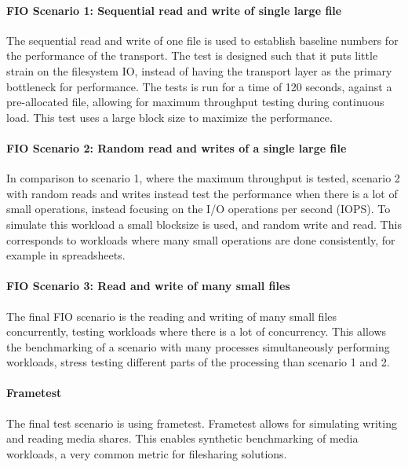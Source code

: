 \documentclass[english, 12pt, a4paper, elec, utf8, a-2b, online]{aaltothesis}
\begin{document}
\paragraph{FIO Scenario 1: Sequential read and write of single large file}

The sequential read and write of one file is used to establish baseline numbers
for the performance of the transport. The test is designed such that it puts little
strain on the filesystem IO, instead of having the transport layer as the primary 
bottleneck for performance. The tests is run for a time of 120 seconds, against a
pre-allocated file, allowing for maximum throughput testing during continuous load.
This test uses a large block size to maximize the performance.

\paragraph{FIO Scenario 2: Random read and writes of a single large file}

In comparison to scenario 1, where the maximum throughput is tested, scenario 2
with random reads and writes instead test the performance when there is a lot of
small operations, instead focusing on the I/O operations per second (IOPS). To simulate
this workload a small blocksize is used, and random write and read. This corresponds
to workloads where many small operations are done consistently, for example in
spreadsheets.

\paragraph{FIO Scenario 3: Read and write of many small files}

The final FIO scenario is the reading and writing of many small files concurrently,
testing workloads where there is a lot of concurrency. This allows the benchmarking
of a scenario with many processes simultaneously performing workloads, stress
testing different parts of the processing than scenario 1 and 2.

\paragraph{Frametest}

The final test scenario is using frametest. Frametest allows for simulating
writing and reading media shares. This enables synthetic benchmarking of media
workloads, a very common metric for filesharing solutions.
\end{document}
